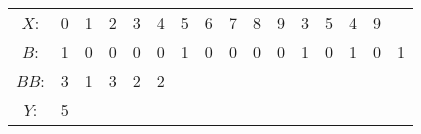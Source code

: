 \begin{tabular}{c|c|c|c|c|c|c|c|c|c|c|c|c|c|c|c|}
	\cline{2-15}
	$X$: & 0 & 1 & 2 & 3 & 4 & 5 & 6 & 7 & 8 & 9 & 3 & 5 & 4 & 9 \\
	\cline{2-16}
	$B$: & 1 & 0 & 0 & 0 & 0 & 1 & 0 & 0 & 0 & 0 & 1 & 0 & 1 & 0 & 1 \\
	\cline{2-16}
	$BB$: & 3 & 1 & 3 & 2 & 2 \\
	\cline{2-6}
	$Y$: & 5 \\
	\cline{2-2}
\end{tabular}

